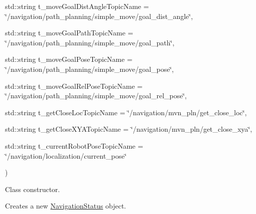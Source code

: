 {\begin{DoxyParamCaption}
\item[{std\+::string}]{t\+\_\+move\+Goal\+Dist\+Angle\+Topic\+Name = {\ttfamily \char`\"{}/navigation/path\+\_\+planning/simple\+\_\+move/goal\+\_\+dist\+\_\+angle\char`\"{}}, }
\item[{std\+::string}]{t\+\_\+move\+Goal\+Path\+Topic\+Name = {\ttfamily \char`\"{}/navigation/path\+\_\+planning/simple\+\_\+move/goal\+\_\+path\char`\"{}}, }
\item[{std\+::string}]{t\+\_\+move\+Goal\+Pose\+Topic\+Name = {\ttfamily \char`\"{}/navigation/path\+\_\+planning/simple\+\_\+move/goal\+\_\+pose\char`\"{}}, }
\item[{std\+::string}]{t\+\_\+move\+Goal\+Rel\+Pose\+Topic\+Name = {\ttfamily \char`\"{}/navigation/path\+\_\+planning/simple\+\_\+move/goal\+\_\+rel\+\_\+pose\char`\"{}}, }
\item[{std\+::string}]{t\+\_\+get\+Close\+Loc\+Topic\+Name = {\ttfamily \char`\"{}/navigation/mvn\+\_\+pln/get\+\_\+close\+\_\+loc\char`\"{}}, }
\item[{std\+::string}]{t\+\_\+get\+Close\+X\+Y\+A\+Topic\+Name = {\ttfamily \char`\"{}/navigation/mvn\+\_\+pln/get\+\_\+close\+\_\+xya\char`\"{}}, }
\item[{std\+::string}]{t\+\_\+current\+Robot\+Pose\+Topic\+Name = {\ttfamily \char`\"{}/navigation/localization/current\+\_\+pose\char`\"{}}}
\end{DoxyParamCaption}
)}\hypertarget{class_navigation_status_aeb7c5af6d198e22e7c9f8504e821cf8d}{}\label{class_navigation_status_aeb7c5af6d198e22e7c9f8504e821cf8d}


Class constructor. 

Creates a new \hyperlink{class_navigation_status}{Navigation\+Status} object.


